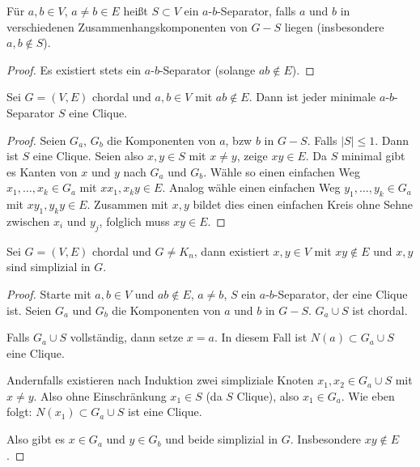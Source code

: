 \begin{df}
    Für $a, b \in V$, $a \neq b \in E$ heißt $S \subset V$ ein $a$-$b$-Separator, falls $a$ und $b$ in verschiedenen Zusammenhangskomponenten von $G - S$ liegen (insbesondere $a,b \not\in S$).
    \begin{proof}
        Es existiert stets ein $a$-$b$-Separator (solange $ab \not\in E$).
    \end{proof}
\end{df}

\begin{st}
    Sei $G = (V, E)$ chordal und $a, b \in V$ mit $ab \not\in E$.
    Dann ist jeder minimale $a$-$b$-Separator $S$ eine Clique.
    \begin{proof}
        Seien $G_a$, $G_b$ die Komponenten von $a$, bzw $b$ in $G - S$.
        Falls $|S| \le 1$.
        Dann ist $S$ eine Clique.
        Seien also $x, y \in S$ mit $x \neq y$, zeige $xy \in E$.
        Da $S$ minimal gibt es Kanten von $x$ und $y$ nach $G_a$ und $G_b$.
        Wähle so einen einfachen Weg $x_1, \dotsc, x_k \in G_a$ mit $xx_1, x_ky \in E$.
        Analog wähle einen einfachen Weg $y_1, \dotsc, y_k \in G_a$ mit $xy_1, y_ky \in E$.
        Zusammen mit $x,y$ bildet dies einen einfachen Kreis ohne Sehne zwischen $x_i$ und $y_j$, folglich muss $xy \in E$.
    \end{proof}
\end{st}


\begin{lem}
    Sei $G = (V, E)$ chordal und $G \neq K_n$, dann existiert $x,y \in V$ mit $xy \not\in E$ und $x,y$ sind simplizial in $G$.
    \begin{proof}
        Starte mit $a,b \in V$ und $ab \not\in E$, $a \neq b$, $S$ ein $a$-$b$-Separator, der eine Clique ist.
        Seien $G_a$ und $G_b$ die Komponenten von $a$ und $b$ in $G - S$.
        $G_a \cup S$ ist chordal.

        Falls $G_a \cup S$ vollständig, dann setze $x = a$.
        In diesem Fall ist $N(a) \subset G_a \cup S$ eine Clique.

        Andernfalls existieren nach Induktion zwei simpliziale Knoten $x_1, x_2 \in G_a \cup S$ mit $x \neq y$.
        Also ohne Einschränkung $x_1 \in S$ (da $S$ Clique), also $x_1 \in G_a$.
        Wie eben folgt: $N(x_1) \subset G_a \cup S$ ist eine Clique.

        Also gibt es $x \in G_a$ und $y \in G_b$ und beide simplizial in $G$.
        Insbesondere $xy \not\in E$.
    \end{proof}
\end{lem}

